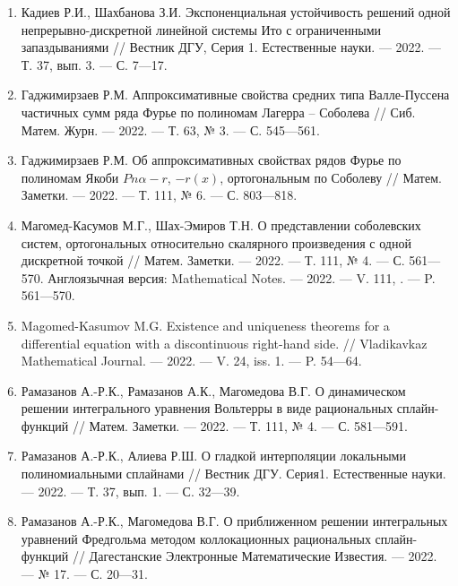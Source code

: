\begin{enumerate}[1]
    \item
    Кадиев Р.И., Шахбанова З.И.
    Экспоненциальная устойчивость решений одной непрерывно-дискретной линейной системы Ито с ограниченными запаздываниями
    //
    Вестник ДГУ, Серия 1. Естественные науки.
    --- 2022.
    --- Т. 37, вып. 3.
    --- С. 7---17.



    \item
    Гаджимирзаев Р.М.
    Аппроксимативные свойства средних типа Валле-Пуссена частичных сумм ряда Фурье по полиномам Лагерра – Соболева
    //
    Сиб. Матем. Журн.
    --- 2022.
    --- Т. 63, № 3.
    --- С. 545---561.

    \item
    Гаджимирзаев Р.М.
    Об аппроксимативных свойствах рядов Фурье по полиномам Якоби $Pn \alpha - r$, $-r(x)$, ортогональным по Соболеву
    //
    Матем. Заметки.
    --- 2022.
    --- Т. 111, № 6.
    --- С. 803---818.



    \item
    Магомед-Касумов М.Г., Шах-Эмиров Т.Н.
    О представлении соболевских систем, ортогональных относительно скалярного произведения с одной дискретной точкой
    //
    Матем. Заметки.
    --- 2022.
    --- Т. 111, № 4.
    --- С. 561---570.
    Англоязычная версия:
    Mathematical Notes.
    --- 2022.
    --- V. 111, .
    --- P. 561---570.

    \item
    Magomed-Kasumov M.G.
    Existence and uniqueness theorems for a differential equation with a discontinuous right-hand side.
    //
    Vladikavkaz Mathematical Journal.
    --- 2022.
    --- V. 24, iss. 1.
    --- P. 54---64.



    \item
    Рамазанов А.-Р.К., Рамазанов А.К., Магомедова В.Г.
    О динамическом решении интегрального уравнения Вольтерры в виде рациональных сплайн-функций
    //
    Матем. Заметки.
    --- 2022.
    --- Т. 111, № 4.
    --- С. 581---591.

    \item
    Рамазанов А.-Р.К., Алиева Р.Ш.
    О гладкой интерполяции локальными полиномиальными сплайнами
    //
    Вестник ДГУ. Серия1. Естественные науки.
    --- 2022.
    --- Т. 37, вып. 1.
    --- С. 32---39.

    \item
    Рамазанов А.-Р.К., Магомедова В.Г.
    О приближенном решении интегральных уравнений Фредгольма методом коллокационных рациональных сплайн-функций
    //
    Дагестанские Электронные Математические Известия.
    --- 2022.
    --- № 17.
    --- С. 20---31.



\end{enumerate}
